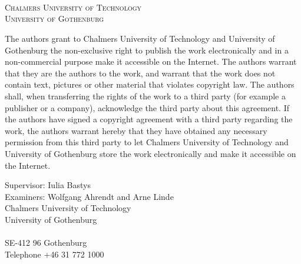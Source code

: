 \newpage
\thispagestyle{empty}
\begin{center}

    \textbf{\Large \ambaTitle} \\[1cm]

    {\linespread{1.2}\large
    \StrSubstitute{\ambaAuthors}{,}{\\}
    \\
    }

    \vfill

    \ambaDepartment \\
    \textsc{Chalmers University of Technology} \\
    \textsc{University of Gothenburg} \\
    \ambaCityCountryYear
\end{center}


\newpage
{The authors grant to Chalmers University of Technology and University of Gothenburg the
    non-exclusive right to publish the work electronically and in a non-commercial purpose make it
    accessible on the Internet. The authors warrant that they are the authors to the work, and
    warrant that the work does not contain text, pictures or other material that violates
    copyright law.
    The authors shall, when transferring the rights of the work to a third party (for example a
    publisher or a company), acknowledge the third party about this agreement. If the authors have
    signed a copyright agreement with a third party regarding the work, the authors warrant
    hereby that they have obtained any necessary permission from this third party to let Chalmers
    University of Technology and University of Gothenburg store the work electronically and make
    it accessible on the Internet.}

Supervisor: Iulia Bastys \\
Examiners: Wolfgang Ahrendt and Arne Linde \\[1cm]


Chalmers University of Technology\\
University of Gothenburg\\
\ambaDepartment \\
SE-412 96 Gothenburg\\
Telephone +46 31 772 1000 \setlength{\parskip}{0.5cm}

\vfill
\ambaCityCountryYear
